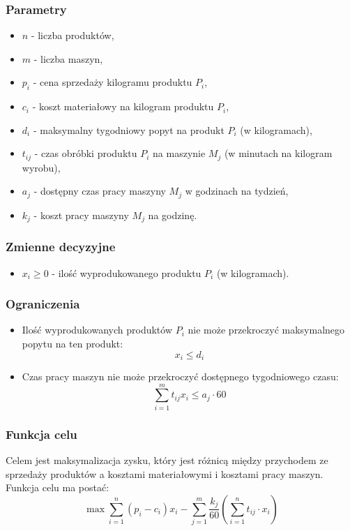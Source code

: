 \documentclass{article}
\begin{document}
\subsubsection{Parametry}
\begin{itemize}
    \item \( n \) - liczba produktów,
    \item \( m \) - liczba maszyn,
    \item \( p_i \) - cena sprzedaży kilogramu produktu \( P_i \),
    \item \( c_i \) - koszt materiałowy na kilogram produktu \( P_i \),
    \item \( d_i \) - maksymalny tygodniowy popyt na produkt \( P_i \) (w kilogramach),
    \item \( t_{ij} \) - czas obróbki produktu \( P_i \) na maszynie \( M_j \) (w minutach na kilogram wyrobu),
    \item \( a_j \) - dostępny czas pracy maszyny \( M_j \) w godzinach na tydzień,
    \item \( k_j \) - koszt pracy maszyny \( M_j \) na godzinę.
\end{itemize}

\subsubsection{Zmienne decyzyjne}
\begin{itemize}
    \item \( x_i \geq 0 \) - ilość wyprodukowanego produktu \( P_i \) (w kilogramach).
\end{itemize}

\subsubsection{Ograniczenia}
\begin{itemize}
    \item Ilość wyprodukowanych produktów \( P_i \) nie może przekroczyć maksymalnego popytu na ten produkt:
    \[
    x_i \leq d_i
    \]
    \item Czas pracy maszyn nie może przekroczyć dostępnego tygodniowego czasu:
    \[
    \sum_{i=1}^{m} t_{ij} x_i \leq a_j \cdot 60
    \]
\end{itemize}

\subsubsection{Funkcja celu}
Celem jest maksymalizacja zysku, który jest różnicą między przychodem ze sprzedaży produktów a kosztami materiałowymi i kosztami pracy maszyn. Funkcja celu ma postać:
\[
\max \sum_{i=1}^{n} (p_i - c_i) x_i - \sum_{j=1}^{m} \frac{k_j}{60} \left( \sum_{i=1}^{n} t_{ij} \cdot x_i \right)
\]
\end{document}
